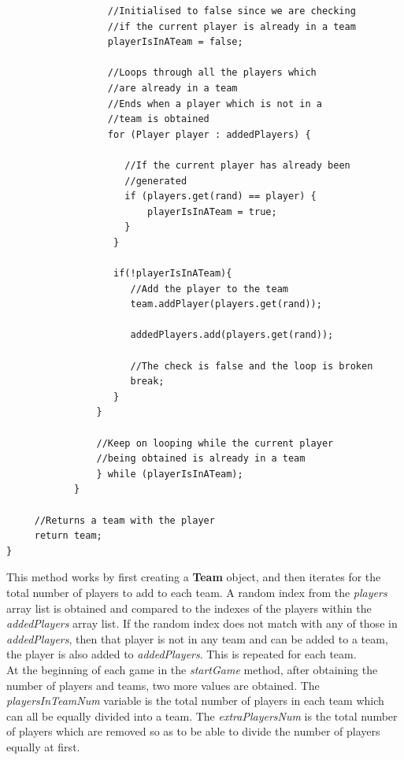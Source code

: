 \documentclass[a4paper,12pt]{extarticle}
\begin{document}
\begin{lstlisting}
                  //Initialised to false since we are checking 
                  //if the current player is already in a team
                  playerIsInATeam = false;

                  //Loops through all the players which 
                  //are already in a team
                  //Ends when a player which is not in a 
                  //team is obtained
                  for (Player player : addedPlayers) {

                     //If the current player has already been 
                     //generated
                     if (players.get(rand) == player) {
                         playerIsInATeam = true;
                     }
                   }

                   if(!playerIsInATeam){
                      //Add the player to the team
                      team.addPlayer(players.get(rand));

                      addedPlayers.add(players.get(rand));

                      //The check is false and the loop is broken
                      break;
                   }
                }

                //Keep on looping while the current player 
                //being obtained is already in a team
                } while (playerIsInATeam);
            }

     //Returns a team with the player
     return team;
}
\end{lstlisting}
\vspace{4mm}

\noindent This method works by first creating a \textbf{Team} object, and then iterates for the total number of players to add to each team. A random index from the \textit{players} array list is obtained and compared to the indexes of the players within the \textit{addedPlayers} array list. If the random index does not match with any of those in \textit{addedPlayers}, then that player is not in any team and can be added to a team, the player is also added to \textit{addedPlayers}. This is repeated for each team.\\

\noindent At the beginning of each game in the \textit{startGame} method, after obtaining the number of players and teams, two more values are obtained. The \textit{playersInTeamNum} variable is the total number of players in each team which can all be equally divided into a team. The \textit{extraPlayersNum} is the total number of players which are removed so as to be able to divide the number of players equally at first. 
\end{document}
